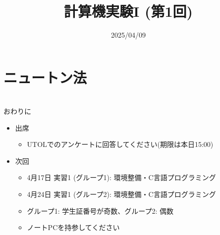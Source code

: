 \documentclass[10pt,dvipdfmx]{beamer}
\title{計算機実験I (第1回)}
\date{2025/04/09}
\begin{document}
\begin{frame}
  \titlepage
  \tableofcontents
\end{frame}








\section{ニュートン法}














\section{}
\begin{frame}[t]{おわりに}
  \begin{itemize}
  \item 出席
  \begin{itemize}
    \item UTOLでのアンケートに回答してください(期限は本日15:00)
  \end{itemize}
  \item 次回
    \begin{itemize}
    \item 4月17日 実習1 (グループ1): 環境整備・C言語プログラミング
    \item 4月24日 実習1 (グループ2): 環境整備・C言語プログラミング
    \item グループ1: 学生証番号が奇数、グループ2: 偶数
    \item ノートPCを持参してください
    \end{itemize}
  \end{itemize}
\end{frame}
\end{document}
